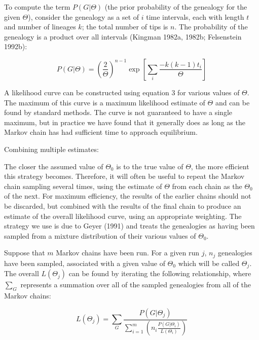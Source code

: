\documentclass[12pt]{article}
\begin{document}
To compute the term $P(G|\Theta)$ (the prior probability of the
genealogy for the given $\Theta$), consider the
genealogy as a set of $i$ time intervals, each with length $t$ and number of
lineages $k$; the total number of tips is $n$.  The probability of the
genealogy is a product over all intervals ({\sc Kingman} 1982a, 1982b;
{\sc Felsenstein} 1992b):

\begin{Large}
\begin{equation}
P(G|\Theta)=\left (\frac{2}{\Theta}\right )^{n-1} \exp \left [{\sum
\limits_i \frac{-k(k-1)t_i}{\Theta}}\right ]
\end{equation}

\end{Large}

\medskip

A likelihood curve can be constructed using equation 3 for various
values of $\Theta$.  The maximum of this curve is a maximum likelihood
estimate of $\Theta$ and can be found by standard methods.  The curve is
not guaranteed to have a single maximum, but in practice we have found
that it generally does as long as the Markov chain has had sufficient
time to approach equilibrium.

\medskip

\begin{bf}
Combining multiple estimates:
\end{bf}
The closer the assumed value of $\Theta_{0}$ is to the true value of
$\Theta$, the more efficient this strategy becomes.  Therefore, it will often
be useful to repeat the Markov chain sampling several times, using the
estimate of $\Theta$ from each chain as the $\Theta_{0}$ of the next.
For maximum efficiency, the results of the earlier chains should not be
discarded, but combined with the results of the final chain to produce an
estimate of the overall likelihood curve, using an appropriate weighting.  The strategy
we use is due to {\sc Geyer} (1991) and treats the genealogies as having been
sampled from a mixture distribution of their various values of
$\Theta_0$.

Suppose that $m$ Markov chains have been run.
For a given run $j$, $n_{j}$ genealogies have been sampled, associated
with a given value of $\Theta_{0}$ which will be called $\Theta_{j}$. 
The overall $L(\Theta_{j})$
can be found by iterating the following relationship, where $\sum_{G}$
represents a summation over all of the sampled genealogies from all of
the Markov chains:

\begin{Large}
\begin{equation}
L(\Theta_{j})=\sum_{G} \frac{P(G|\Theta_{j})}
{\sum \limits_{i=1}^{m} \left ( n_{i} \frac{P(G|\Theta_{i})}{L(\Theta_{i})}
\right )}
\end{equation}
\end{Large}
\end{document}
